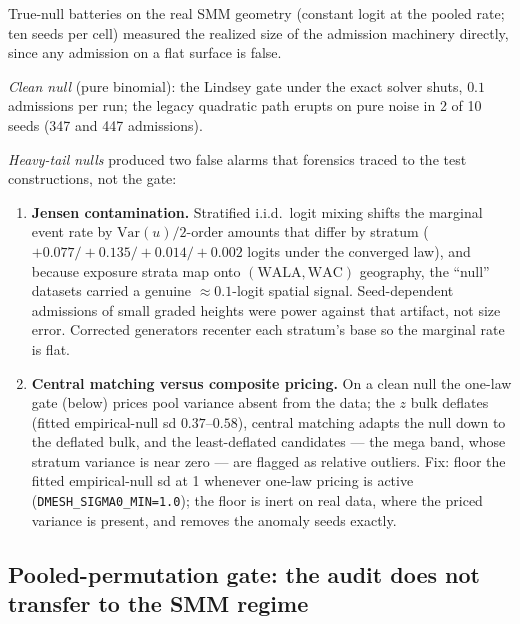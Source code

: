 \documentclass[11pt]{article}
\begin{document}
True-null batteries on the real SMM geometry (constant logit at the pooled
rate; ten seeds per cell) measured the realized size of the admission
machinery directly, since any admission on a flat surface is false.

\emph{Clean null} (pure binomial): the Lindsey gate under the exact solver
shuts, $0.1$ admissions per run; the legacy quadratic path erupts on pure
noise in 2 of 10 seeds (347 and 447 admissions).

\emph{Heavy-tail nulls} produced two false alarms that forensics traced to
the test constructions, not the gate:

\begin{enumerate}[leftmargin=2em,itemsep=2pt]
\item \textbf{Jensen contamination.} Stratified i.i.d.\ logit mixing shifts
the marginal event rate by $\mathrm{Var}(u)/2$-order amounts that differ by
stratum ($+0.077/+0.135/+0.014/+0.002$ logits under the converged law), and
because exposure strata map onto $(\mathrm{WALA},\mathrm{WAC})$ geography,
the ``null'' datasets carried a genuine $\approx 0.1$-logit spatial signal.
Seed-dependent admissions of small graded heights were power against that
artifact, not size error. Corrected generators recenter each stratum's base
so the marginal rate is flat.
\item \textbf{Central matching versus composite pricing.} On a clean null
the one-law gate (below) prices pool variance absent from the data; the
$z$ bulk deflates (fitted empirical-null sd $0.37$--$0.58$), central
matching adapts the null down to the deflated bulk, and the least-deflated
candidates --- the mega band, whose stratum variance is near zero --- are
flagged as relative outliers. Fix: floor the fitted empirical-null sd at 1
whenever one-law pricing is active (\texttt{DMESH\_SIGMA0\_MIN=1.0}); the
floor is inert on real data, where the priced variance is present, and
removes the anomaly seeds exactly.
\end{enumerate}

\subsection{Pooled-permutation gate: the audit does not transfer to the SMM regime}
\end{document}

